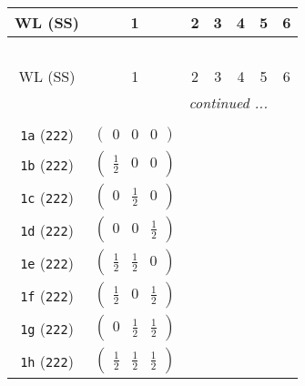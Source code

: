\documentclass[fleqn,9pt,landscape]{jsarticle}
\begin{document}
\begin{center}
\renewcommand{\arraystretch}{1.2}
\begin{longtable}{ccccccc}
 \hline \hline
WL (SS) & 1 & 2 & 3 & 4 & 5 & 6 \\ \hline \endfirsthead

\multicolumn{6}{l}{\tablename\ \thetable{}} \\
 \hline \hline
WL (SS) & 1 & 2 & 3 & 4 & 5 & 6 \\ \hline \endhead

 \hline \hline
\multicolumn{6}{r}{\footnotesize\it continued ...} \\ \endfoot

 \hline \hline
\multicolumn{6}{r}{} \\ \endlastfoot

{\tt 1a} ({\tt 222}) & $ \begin{pmatrix} 0 & 0 & 0 \end{pmatrix} $ & $  $ & $  $ & $  $ \\ \hline
{\tt 1b} ({\tt 222}) & $ \begin{pmatrix} \frac{1}{2} & 0 & 0 \end{pmatrix} $ & $  $ & $  $ & $  $ \\ \hline
{\tt 1c} ({\tt 222}) & $ \begin{pmatrix} 0 & \frac{1}{2} & 0 \end{pmatrix} $ & $  $ & $  $ & $  $ \\ \hline
{\tt 1d} ({\tt 222}) & $ \begin{pmatrix} 0 & 0 & \frac{1}{2} \end{pmatrix} $ & $  $ & $  $ & $  $ \\ \hline
{\tt 1e} ({\tt 222}) & $ \begin{pmatrix} \frac{1}{2} & \frac{1}{2} & 0 \end{pmatrix} $ & $  $ & $  $ & $  $ \\ \hline
{\tt 1f} ({\tt 222}) & $ \begin{pmatrix} \frac{1}{2} & 0 & \frac{1}{2} \end{pmatrix} $ & $  $ & $  $ & $  $ \\ \hline
{\tt 1g} ({\tt 222}) & $ \begin{pmatrix} 0 & \frac{1}{2} & \frac{1}{2} \end{pmatrix} $ & $  $ & $  $ & $  $ \\ \hline
{\tt 1h} ({\tt 222}) & $ \begin{pmatrix} \frac{1}{2} & \frac{1}{2} & \frac{1}{2} \end{pmatrix} $ & $  $ & $  $ & $  $ \\ \hline

\end{longtable}
\end{center}
\end{document}
